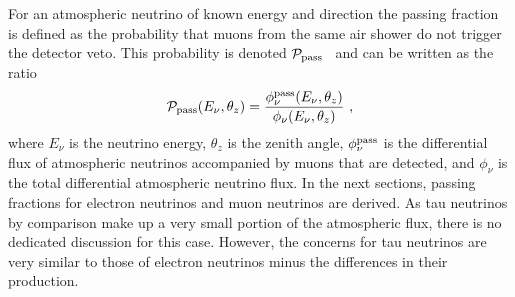 For an atmospheric neutrino of known energy and direction the passing fraction is defined as the probability that muons from the same air shower do not trigger the detector veto.
This probability is denoted ${\cal P}_{\rm pass}$~\cite{Schonert:2008is, Gaisser:2014bja} and can be written as the ratio
\begin{equation}
{\cal P}_{\rm pass} (E_\nu, \theta_z) = \frac{\phi_\nu^{\rm pass}(E_\nu, \theta_z)}{\phi_\nu(E_\nu, \theta_z)} ~,
\end{equation}
where $E_\nu$ is the neutrino energy, $\theta_z$ is the zenith angle, $\phi_\nu^{\rm pass}$ is the differential flux of atmospheric neutrinos accompanied by muons that are detected, and $\phi_\nu$ is the total differential atmospheric neutrino flux.
In the next sections, passing fractions for electron neutrinos and muon neutrinos are derived.
As tau neutrinos by comparison make up a very small portion of the atmospheric flux, there is no dedicated discussion for this case.
However, the concerns for tau neutrinos are very similar to those of electron neutrinos minus the differences in their production.

